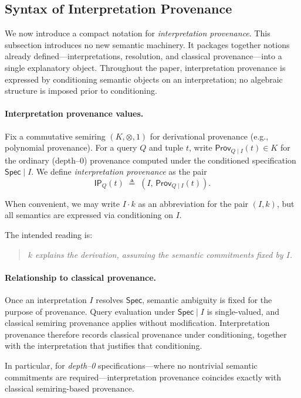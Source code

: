 \documentclass[acmsmall,nonacm]{acmart}
\theoremstyle{remark}
\numberwithin{definition}{section}
\numberwithin{theorem}{section}
\numberwithin{lemma}{section}
\numberwithin{corollary}{section}
\numberwithin{remark}{section}
\numberwithin{example}{section}
\numberwithin{observation}{section}
\numberwithin{assumption}{section}
\newcommand{\Spec}{\mathsf{Spec}}
\newcommand{\Prov}{\mathsf{Prov}}
\begin{document}
\subsection{Syntax of Interpretation Provenance}

We now introduce a compact notation for \emph{interpretation provenance}.
This subsection introduces no new semantic machinery.
It packages together notions already defined—interpretations, resolution, and
classical provenance—into a single explanatory object.
Throughout the paper, interpretation provenance is expressed by conditioning semantic objects on an interpretation; no algebraic structure is imposed prior to conditioning.

\paragraph{Interpretation provenance values.}
Fix a commutative semiring $(K,\otimes,1)$ for derivational provenance
(e.g., polynomial provenance).
For a query $Q$ and tuple $t$, write $\Prov_{Q \mid I}(t) \in K$ for the
ordinary (depth--0) provenance computed under the conditioned specification
$\Spec \mid I$.
We define \emph{interpretation provenance} as the pair
\[
  \mathsf{IP}_Q(t) \;\triangleq\; (I,\, \Prov_{Q \mid I}(t)).
\]

When convenient, we may write $I \cdot k$ as an abbreviation for the pair $(I,k)$,
but all semantics are expressed via conditioning on $I$.

The intended reading is:
\begin{quote}
\emph{$k$ explains the derivation, assuming the semantic commitments fixed by $I$.}
\end{quote}

\paragraph{Relationship to classical provenance.}
Once an interpretation $I$ resolves $\Spec$, semantic ambiguity is fixed for the purpose of provenance.
Query evaluation under $\Spec \mid I$ is single-valued, and classical semiring
provenance applies without modification.
Interpretation provenance therefore records classical provenance under
conditioning, together with the interpretation that justifies that conditioning.

In particular, for \emph{depth--0} specifications—where no nontrivial semantic
commitments are required—interpretation provenance coincides exactly with
classical semiring-based provenance.
\end{document}
